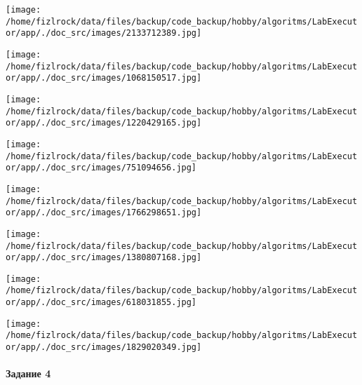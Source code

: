 \documentclass[a4paper, 12pt]{article}
\begin{document}
\texttt{[image: /home/fizlrock/data/files/backup/code\_backup/hobby/algoritms/LabExecutor/app/./doc\_src/images/2133712389.jpg]}

\texttt{[image: /home/fizlrock/data/files/backup/code\_backup/hobby/algoritms/LabExecutor/app/./doc\_src/images/1068150517.jpg]}

\texttt{[image: /home/fizlrock/data/files/backup/code\_backup/hobby/algoritms/LabExecutor/app/./doc\_src/images/1220429165.jpg]}

\texttt{[image: /home/fizlrock/data/files/backup/code\_backup/hobby/algoritms/LabExecutor/app/./doc\_src/images/751094656.jpg]}

\texttt{[image: /home/fizlrock/data/files/backup/code\_backup/hobby/algoritms/LabExecutor/app/./doc\_src/images/1766298651.jpg]}

\texttt{[image: /home/fizlrock/data/files/backup/code\_backup/hobby/algoritms/LabExecutor/app/./doc\_src/images/1380807168.jpg]}

\texttt{[image: /home/fizlrock/data/files/backup/code\_backup/hobby/algoritms/LabExecutor/app/./doc\_src/images/618031855.jpg]}

\texttt{[image: /home/fizlrock/data/files/backup/code\_backup/hobby/algoritms/LabExecutor/app/./doc\_src/images/1829020349.jpg]}
\pagebreak
\paragraph{Задание 4}
\end{document}
